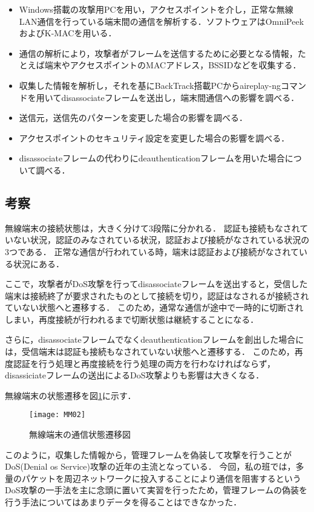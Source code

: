 \begin{itemize}
\item Windows搭載の攻撃用PCを用い，アクセスポイントを介し，正常な無線LAN通信を行っている端末間の通信を解析する．ソフトウェアはOmniPeekおよびK-MACを用いる．
\item 通信の解析により，攻撃者がフレームを送信するために必要となる情報，たとえば端末やアクセスポイントのMACアドレス，BSSIDなどを収集する．
\item 収集した情報を解析し，それを基にBackTrack搭載PCからaireplay-ngコマンドを用いてdisassociateフレームを送出し，端末間通信への影響を調べる．
\item 送信元，送信先のパターンを変更した場合の影響を調べる．
\item アクセスポイントのセキュリティ設定を変更した場合の影響を調べる．
\item disassociateフレームの代わりにdeauthenticationフレームを用いた場合について調べる．
\end{itemize}

\subsection{考察}
無線端末の接続状態は，大きく分けて3段階に分かれる．
認証も接続もなされていない状況，認証のみなされている状況，認証および接続がなされている状況の3つである．
正常な通信が行われている時，端末は認証および接続がなされている状況にある．

ここで，攻撃者がDoS攻撃を行ってdisassociateフレームを送出すると，受信した端末は接続終了が要求されたものとして接続を切り，認証はなされるが接続されていない状態へと遷移する．
このため，通常な通信が途中で一時的に切断されしまい，再度接続が行われるまで切断状態は継続することになる．

さらに，disassociateフレームでなくdeauthenticationフレームを創出した場合には，受信端末は認証も接続もなされていない状態へと遷移する．
このため，再度認証を行う処理と再度接続を行う処理の両方を行わなければならず，disassiciateフレームの送出によるDoS攻撃よりも影響は大きくなる．

無線端末の状態遷移を図\ref{tanmatu}に示す．

\begin{figure}
  \hspace*{\fill}
  \texttt{[image: MM02]}
  \hspace*{\fill}
  \caption{無線端末の通信状態遷移図}
  \label{tanmatu}
\end{figure}

このように，収集した情報から，管理フレームを偽装して攻撃を行うことがDoS(Denial os Service)攻撃の近年の主流となっている．
今回，私の班では，多量のパケットを周辺ネットワークに投入することにより通信を阻害するというDoS攻撃の一手法を主に念頭に置いて実習を行ったため，管理フレームの偽装を行う手法についてはあまりデータを得ることはできなかった．


